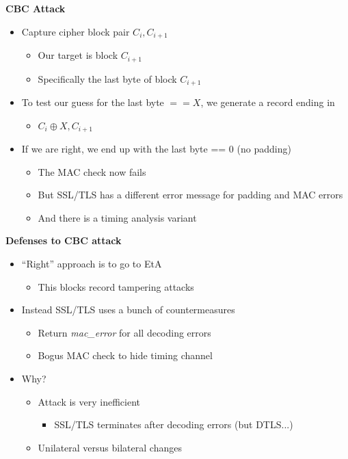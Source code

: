 \documentclass[helvetica]{seminar}
\newcommand{\heading}[1]{%
  \begin{center} 
    \large\bf 
    #1 
  \end{center} 
  \vspace{.4 in}}
\begin{document}
\begin{slide}
\heading{CBC Attack~\cite{vaudenay-tls-cbc}}

\begin{itemize}
\item Capture cipher block pair $C_i, C_{i+1}$
  \begin{itemize}
  \item Our target is block $C_{i+1}$
  \item Specifically the last byte of block $C_{i+1}$
  \end{itemize}

\item To test our guess for the last byte $==X$, we generate a record ending in
  \begin{itemize}
  \item $C_i \oplus X, C_{i+1}$
  \end{itemize}

\item If we are right, we end up with the last byte == 0 (no padding)
  \begin{itemize}
  \item The MAC check now fails
  \item But SSL/TLS has a different error message for padding and MAC errors
  \item And there is a timing analysis variant
  \end{itemize}
\end{itemize}
\end{slide}


\begin{slide}
\heading{Defenses to CBC attack}

\begin{itemize}
\item ``Right'' approach is to go to EtA
  \begin{itemize}
  \item This blocks record tampering attacks
  \end{itemize}

\item Instead SSL/TLS uses a bunch of countermeasures
  \begin{itemize}
  \item Return \textsl{mac\_error} for all decoding errors
  \item Bogus MAC check to hide timing channel
  \end{itemize}

\item Why?
  \begin{itemize}
  \item Attack is very inefficient
    \begin{itemize}
    \item SSL/TLS terminates after decoding errors (but DTLS...)
    \end{itemize}
  \item Unilateral versus bilateral changes
  \end{itemize}
\end{itemize}

\end{slide}
\end{document}
